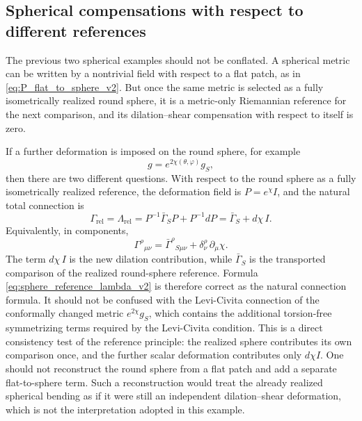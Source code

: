 \documentclass[12pt]{amsart}
\theoremstyle{definition}
\theoremstyle{remark}
\begin{document}
\subsection{Spherical compensations with respect to different references}\label{subsec:sphere_compensations_different_references_v2}

The previous two spherical examples should not be conflated.  A spherical metric can be written by a nontrivial field with respect to a flat patch, as in \eqref{eq:P_flat_to_sphere_v2}.  But once the same metric is selected as a fully isometrically realized round sphere, it is a metric-only Riemannian reference for the next comparison, and its dilation--shear compensation with respect to itself is zero.

If a further deformation is imposed on the round sphere, for example
\begin{equation}
 g=e^{2\chi(\theta,\varphi)}g_S,
\end{equation}
then there are two different questions.  With respect to the round sphere as a fully isometrically realized reference, the deformation field is \(P=e^\chi I\), and the natural total connection is
\begin{equation}\label{eq:sphere_reference_lambda_v2}
 \Gamma_{\mathrm{rel}}=\Lambda_{\mathrm{rel}}
 =P^{-1}\bar\Gamma_SP+P^{-1}dP
 =\bar\Gamma_S+d\chi\,I .
\end{equation}
Equivalently, in components,
\begin{equation}\label{eq:sphere_reference_lambda_components_v2}
 \Gamma^\rho{}_{\mu\nu}
 =\bar\Gamma^\rho{}_{S\mu\nu}+\delta^\rho_\nu\,\partial_\mu\chi .
\end{equation}
The term \(d\chi\,I\) is the new dilation contribution, while \(\bar\Gamma_S\) is the transported comparison of the realized round-sphere reference.  Formula \eqref{eq:sphere_reference_lambda_v2} is therefore correct as the natural connection formula.  It should not be confused with the Levi-Civita connection of the conformally changed metric \(e^{2\chi}g_S\), which contains the additional torsion-free symmetrizing terms required by the Levi-Civita condition.  This is a direct consistency test of the reference principle: the realized sphere contributes its own comparison once, and the further scalar deformation contributes only \(d\chi I\).  One should not reconstruct the round sphere from a flat patch and add a separate flat-to-sphere term.  Such a reconstruction would treat the already realized spherical bending as if it were still an independent dilation--shear deformation, which is not the interpretation adopted in this example.
\end{document}

